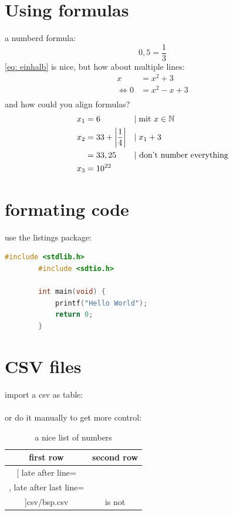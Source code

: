 \documentclass[	%
		11pt,a4paper,	%
		twoside,		%
		english,		%
		f1				%
	]{HsH-report}		%
\begin{document}
\section{Using formulas}
	\label{sec: formula}
	a numberd formula:
	\begin{equation}
		\label{eq: einhalb} %
		0,5=\frac{1}{3}
	\end{equation}
	\autoref{eq: einhalb} is nice, but how about multiple lines:
	\begin{equation}
	\begin{split} %
		x &= x^2+3 \\
		\Leftrightarrow 0 &= x^2-x+3 \\
	\end{split}
	\end{equation}
	and how could you align formulas?
	\begin{align}
		x_1 &= 6 &&|\;\mbox{mit } x \in \mathbb{N} \\
		x_2 &= 33+\left\vert\frac{1}{4}\right\vert &&|\;x_1+3 \\
			&= 33,25 &&\mbox{| don't number everything} \notag \\
		x_3 &= 10^{22}
	\end{align}

\section{formating code}
	\label{sec: code}
	use the listings package:
	\begin{lstlisting}[language=c,gobble=8]
		#include <stdlib.h>
		#include <sdtio.h>

		int main(void) {
			printf("Hello World");
			return 0;
		}
	\end{lstlisting}

\section{CSV files}
	\label{sec: messwerte}
	import a csv as table:\\
	\\
	or do it manually to get more control:
	\begin{table}
		\caption{a nice list of numbers}
		\begin{tabular}{c|c}
			first row & second row \\\hline\hline
			\csvreader[
				late after line=\\\hline,
				late after last line=\\\hline
			]{csv/bsp.csv}{}{number: $\csvcoli\,\metre$ & is not \csvcoliii}
		\end{tabular}
	\end{table}
\end{document}
